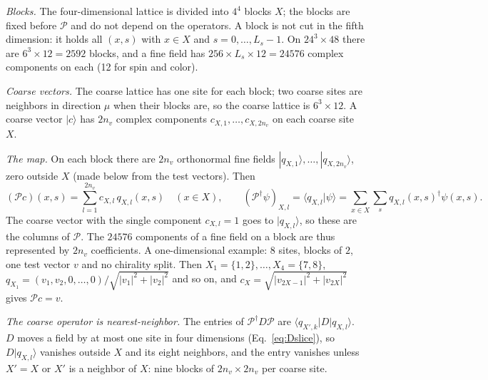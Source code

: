 \documentclass[11pt,a4paper]{article}
\numberwithin{equation}{section}
\newcommand{\dg}{^{\dagger}}
\newcommand{\Pro}{\mathcal P}
\begin{document}
\emph{Blocks.} The four-dimensional lattice is divided into $4^4$ blocks $X$; the blocks are fixed
before $\Pro$ and do not depend on the operators. A block is not cut in the fifth dimension: it
holds all $(x,s)$ with $x\in X$ and $s=0,\dots,L_s-1$. On $24^3\times48$ there are
$6^3\times12=2592$ blocks, and a fine field has $256\times L_s\times12=24576$ complex components
on each (12 for spin and color).

\emph{Coarse vectors.} The coarse lattice has one site for each block; two coarse sites are
neighbors in direction $\mu$ when their blocks are, so the coarse lattice is $6^3\times12$. A
coarse vector $|c\rangle$ has $2n_v$ complex components $c_{X,1},\dots,c_{X,2n_v}$ on each coarse
site $X$.

\emph{The map.} On each block there are $2n_v$ orthonormal fine fields
$|q_{X,1}\rangle,\dots,|q_{X,2n_v}\rangle$, zero outside $X$ (made below from the test vectors).
Then
\begin{equation}
(\Pro c)(x,s)=\sum_{l=1}^{2n_v}c_{X,l}\,q_{X,l}(x,s)\quad (x\in X),\qquad
(\Pro\dg\psi)_{X,l}=\langle q_{X,l}|\psi\rangle=\sum_{x\in X}\sum_s q_{X,l}(x,s)\dg\psi(x,s).
\end{equation}
The coarse vector with the single component $c_{X,l}=1$ goes to $|q_{X,l}\rangle$, so these are
the columns of $\Pro$. The $24576$ components of a fine field on a block are thus represented by
$2n_v$ coefficients. A one-dimensional example: $8$ sites, blocks of $2$, one test vector $v$
and no chirality split. Then $X_1=\{1,2\},\dots,X_4=\{7,8\}$,
$q_{X_1}=(v_1,v_2,0,\dots,0)/\sqrt{|v_1|^2+|v_2|^2}$ and so on, and
$c_X=\sqrt{|v_{2X-1}|^2+|v_{2X}|^2}$ gives $\Pro c=v$.

\emph{The coarse operator is nearest-neighbor.} The entries of $\Pro\dg D\Pro$ are $\langle
q_{X',k}|D|q_{X,l}\rangle$. $D$ moves a field by at most one site in four dimensions
(Eq.~\eqref{eq:Dslice}), so $D|q_{X,l}\rangle$ vanishes outside $X$ and its eight neighbors, and the
entry vanishes unless $X'=X$ or $X'$ is a neighbor of $X$: nine blocks of $2n_v\times2n_v$ per coarse site.
\end{document}
